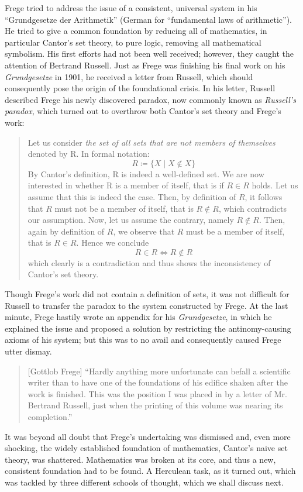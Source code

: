 \documentclass{article}
\begin{document}
Frege tried to address the issue of a consistent, universal system in his ``Grundgesetze der Arithmetik'' (German for ``fundamental laws of arithmetic''). He tried to give a common foundation by reducing all of mathematics, in particular Cantor's set theory, to pure logic, removing all mathematical symbolism. His first efforts had not been well received; however, they caught the attention of Bertrand Russell. Just as Frege was finishing his final work on his \textit{Grundgesetze} in 1901, he received a letter from Russell, which should consequently pose the origin of the foundational crisis. In his letter, Russell described Frege his newly discovered paradox, now commonly known as \textit{Russell's paradox}, which turned out to overthrow both Cantor's set theory and Frege's work:
\begin{quote}
Let us consider \textit{the set of all sets that are not members of themselves} denoted by R. In formal notation:
\begin{equation*}
	R\coloneqq\{X\mid X\notin X\}
\end{equation*}
By Cantor's definition, R is indeed a well-defined set.
We are now interested in whether R is a member of itself, that is if $R\in R$ holds.
Let us assume that this is indeed the case. Then, by definition of $R$, it follows that $R$ must not be a member of itself, that is $R\notin R$, which contradicts our assumption. Now, let us assume the contrary, namely $R\notin R$. Then, again by definition of $R$, we observe that $R$ must be a member of itself, that is $R\in R$. Hence we conclude
\begin{equation*}
		R\in R\iff R\notin R
\end{equation*}
which clearly is a contradiction and thus shows the inconsistency of Cantor's set theory.
\end{quote}
Though Frege's work did not contain a definition of sets, it was not difficult for Russell to transfer the paradox to the system constructed by Frege. At the last minute, Frege hastily wrote an appendix for his \textit{Grundgesetze}, in which he explained the issue and proposed a solution by restricting the antinomy-causing axioms of his system; but this was to no avail and consequently caused Frege utter dismay.
\begin{quote}[Gottlob Frege]
``Hardly anything more unfortunate can befall a scientific writer than to have one of the foundations of his edifice shaken after the work is finished. This was the position I was placed in by a letter of Mr. Bertrand Russell, just when the printing of this volume was nearing its completion.''\cite{frege_appendix}
\end{quote}
It was beyond all doubt that Frege's undertaking was dismissed and, even more shocking, the widely established foundation of mathematics, Cantor's naive set theory, was shattered. Mathematics was broken at its core, and thus a new, consistent foundation had to be found. A Herculean task, as it turned out, which was tackled by three different schools of thought, which we shall discuss next.
\end{document}
